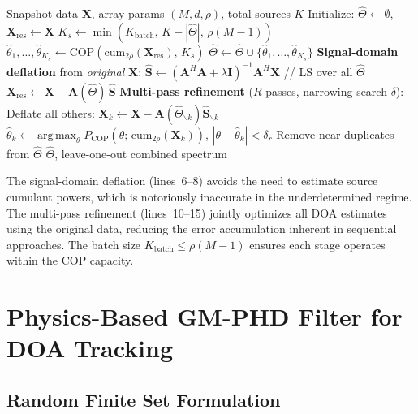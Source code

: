 \documentclass[journal]{IEEEtran}
\newcommand{\mat}[1]{\mathbf{#1}}
\DeclareMathOperator*{\argmax}{arg\,max}
\begin{document}
\begin{algorithm}[t]
\caption{SD-COP: Sequential Deflation COP}
\label{alg:sdcop}
\begin{algorithmic}[1]
\REQUIRE Snapshot data $\mat{X}$, array params $(M, d, \rho)$, total sources $K$
\STATE Initialize: $\hat{\Theta} \leftarrow \emptyset$, $\mat{X}_{\mathrm{res}} \leftarrow \mat{X}$
\WHILE{$|\hat{\Theta}| < K$ and $\|\mat{X}_{\mathrm{res}}\|^2 / \|\mat{X}\|^2 > \epsilon$}
    \STATE $K_s \leftarrow \min(K_{\mathrm{batch}},\, K - |\hat{\Theta}|,\, \rho(M-1))$
    \STATE $\hat{\theta}_1, \ldots, \hat{\theta}_{K_s} \leftarrow \mathrm{COP}(\mathrm{cum}_{2\rho}(\mat{X}_{\mathrm{res}}),\, K_s)$
    \STATE $\hat{\Theta} \leftarrow \hat{\Theta} \cup \{\hat{\theta}_1, \ldots, \hat{\theta}_{K_s}\}$
    \STATE \textbf{Signal-domain deflation} from \emph{original} $\mat{X}$:
    \STATE $\hat{\mat{S}} \leftarrow (\mat{A}^H\mat{A} + \lambda\mat{I})^{-1}\mat{A}^H\mat{X}$ \hfill // LS over all $\hat{\Theta}$
    \STATE $\mat{X}_{\mathrm{res}} \leftarrow \mat{X} - \mat{A}(\hat{\Theta})\,\hat{\mat{S}}$
\ENDWHILE
\STATE \textbf{Multi-pass refinement} ($R$ passes, narrowing search $\delta$):
        \STATE Deflate all others: $\mat{X}_k \leftarrow \mat{X} - \mat{A}(\hat{\Theta}_{\backslash k})\hat{\mat{S}}_{\backslash k}$
        \STATE $\hat{\theta}_k \leftarrow \argmax_\theta P_{\mathrm{COP}}(\theta;\, \mathrm{cum}_{2\rho}(\mat{X}_k))$, $|\theta - \hat{\theta}_k| < \delta_r$
    \ENDFOR
    \STATE Remove near-duplicates from $\hat{\Theta}$
\ENDFOR
\RETURN $\hat{\Theta}$, leave-one-out combined spectrum
\end{algorithmic}
\end{algorithm}

The signal-domain deflation (lines~6--8) avoids the need to estimate source cumulant powers, which is notoriously inaccurate in the underdetermined regime. The multi-pass refinement (lines~10--15) jointly optimizes all DOA estimates using the original data, reducing the error accumulation inherent in sequential approaches. The batch size $K_{\mathrm{batch}} \leq \rho(M-1)$ ensures each stage operates within the COP capacity.

\section{Physics-Based GM-PHD Filter for DOA Tracking}
\label{sec:tracking}

\subsection{Random Finite Set Formulation}
\end{document}
